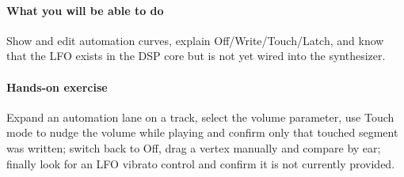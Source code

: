 \paragraph{What you will be able to do} Show and edit automation curves, explain Off/Write/Touch/Latch, and know that the LFO exists in the DSP core but is not yet wired into the synthesizer.

\paragraph{Hands-on exercise} Expand an automation lane on a track, select the volume parameter, use Touch mode to nudge the volume while playing and confirm only that touched segment was written; switch back to Off, drag a vertex manually and compare by ear; finally look for an LFO vibrato control and confirm it is not currently provided.
